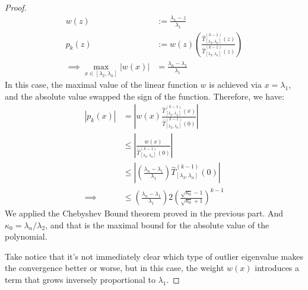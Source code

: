 \documentclass[]{article}
\theoremstyle{definition}
\begin{document}
            \begin{proof}
                \begin{align}
                    w(z) &:=  \frac{\lambda_1 - z}{\lambda_1} 
                    \\
                    p_k(z) &:= w(z)\left(
                        \frac{\hat{T}_{[\lambda_2, \lambda_n]}^{(k - 1)}(z)}
                        {
                            \hat{T}_{[\lambda_2, \lambda_n]}^{(k - 1)}(z)
                        }
                    \right)
                    \\\implies
                    \max_{x\in[\lambda_2, \lambda_n]} |w(x)| &=
                    \frac{\lambda_n - \lambda_1}{\lambda_1}
                \end{align}
                In this case, the maximal value of the linear function $w$ is achieved via $x = \lambda_1$, and the absolute value swapped the sign of the function. Therefore, we have: 
                \begin{align}
                    |p_k(x)| &= 
                    \left|
                        w(x) 
                        \frac{\hat{T}_{[\lambda_2, \lambda_n]}^{(k - 1)}(x)}
                        {
                            \hat{T}_{[\lambda_2, \lambda_n]}^{(k - 1)}(0)
                        }
                    \right|
                    \\
                    &\le 
                    \left|
                        \frac{w(x)}{\hat{T}_{[\lambda_2, \lambda_n]}^{(k - 1)}(0)}
                    \right|
                    \\
                    & \le
                    \left| 
                        \left(
                            \frac{\lambda_n - \lambda_1}{\lambda_1}
                        \right)
                        \hat{T}_{[\lambda_2, \lambda_n]}^{(k - 1)}(0)
                    \right|
                    \\
                    \implies 
                    & \le   
                    \left(
                        \frac{\lambda_n - \lambda_1}{\lambda_1}
                    \right)
                    2\left(
                        \frac{\sqrt{\kappa_0} - 1}{\sqrt{\kappa_0} + 1}
                    \right)^{k - 1}
                \end{align}
                We applied the Chebyshev Bound theorem proved in the previous part. And $\kappa_0 = \lambda_n/\lambda_2$, and that is the maximal bound for the absolute value of the polynomial.
                \par
                Take notice that it's not immediately clear which type of outlier eigenvalue makes the convergence better or worse, but in this case, the weight $w(x)$ introduces a term that grows inversely proportional to $\lambda_1$. 
            \end{proof}
\end{document}
